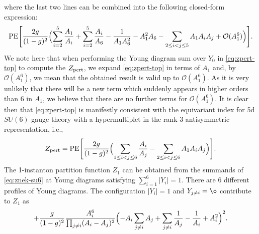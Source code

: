 where the last two lines can be  combined into the following closed-form expression:
\begin{align}
  \text{PE} \Biggl[ 
    \frac{2g}{(1-g)^2} 
    \Bigl(\sum_{i=2}^5  \frac{A_1}{A_i} +\sum_{i=2}^5  \frac{A_i}{A_6} - \frac{1}{A_1A_6^2} - A_1^2  A_6 
    - \sum_{2\leq i<j \leq 5} A_1 A_i  A_j + \mathcal{O}(A_1^6)
    \Bigr)
    \Biggr].
\end{align}
We note here that when performing the Young diagram sum over $Y_0$ in \eqref{eq:zpert-top} to compute the $Z_{\rm pert}$, we expand \eqref{eq:zpert-top} in terms of $A_1$ and, by $\mathcal{O}(A_1^6)$, we mean that the obtained result is valid up to $\mathcal{O}(A_1^6)$. As it is very unlikely that there will be a new term which suddenly appears  in higher orders than 6 in $A_1$, we believe that there are no further terms for $\mathcal{O}(A_1^6)$.  
It is clear then that \eqref{eq:zpert-top} is manifestly consistent with the equivariant index  \cite{Shadchin:2005mx} for 5d $SU(6)$ gauge theory with a hypermultiplet in the rank-3 antisymmetric representation, %
i.e., 
\begin{align}
  Z_{\rm pert}  = \text{PE} \Biggl[ 
    \frac{2g}{(1-g)^2} 
    \Bigl(\sum_{1\leq i<j \leq 6}  \frac{A_i}{A_j} 
    - \sum_{2\leq i<j \leq 6} A_1 A_i  A_j %
    \Bigr)
    \Biggr].
\end{align}
The 1-instanton partition function $Z_1$ can be obtained from the summands of \eqref{eq:znek-su6} at Young diagrams satisfying $\sum_{i=1}^6 |Y_i|=1$. There are 6 different profiles of Young diagrams. The configuration $|Y_i| = 1$ and %
$Y_{j\neq i} = \o$ contribute to $Z_{1}$ as
\begin{align}
  + \frac{g}{(1-g)^2} \frac{A_i^6}{\prod_{j \neq i} (A_i - A_j)^2} 
  \Bigl(-A_i \sum_{j\neq i} A_j +  \sum_{j\neq i}\frac{1}{A_j}  - \frac{1}{A_i} + A_i^2
 \Bigr)^2. 
\end{align}
